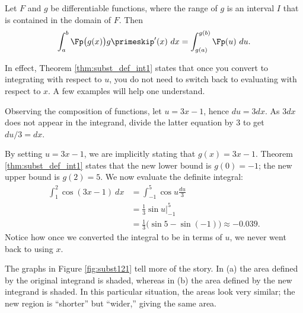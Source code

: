 {Let $F$ and $g$ be differentiable functions, where the range of $g$ is an interval $I$ that is contained in the domain of $F$. Then 
$$\int_a^b \Fp\big(g(x)\big)g\primeskip'(x)\ dx = \int_{g(a)}^{g(b)} \Fp(u)\ du.$$
}

In effect, Theorem \ref{thm:subst_def_int1} states that once you convert to integrating with respect to $u$, you do not need to switch back to evaluating with respect to $x$. A few examples will help one understand.\\

{Observing the composition of functions, let $u=3x-1$, hence $du = 3dx$. As $3dx$ does not appear in the integrand, divide the latter equation by 3 to get $du/3 = dx$. 

By setting $u = 3x-1$, we are implicitly stating that $g(x) = 3x-1$. Theorem \ref{thm:subst_def_int1} states that the new lower bound is $g(0) = -1$; the new upper bound is $g(2) = 5$. We now evaluate the definite integral:
\begin{align*}
\int_1^2 \cos(3x-1) \ dx &=	\int_{-1}^5 \cos u \frac{du}{3} \\
								&= \frac{1}{3} \sin u\Big|_{-1}^5 \\
								&= \frac{1}{3}\big(\sin 5- \sin (-1)\big)\approx -0.039.
\end{align*}
Notice how once we converted the integral to be in terms of $u$, we never went back to using $x$.

{%
}%
{%
}%

The graphs in Figure \ref{fig:subst121} tell more of the story. In (a) the area defined by the original integrand is shaded, whereas in (b) the area defined by the new integrand is shaded. In this particular situation, the areas look very similar; the new region is ``shorter'' but ``wider,'' giving the same area.
}\\

